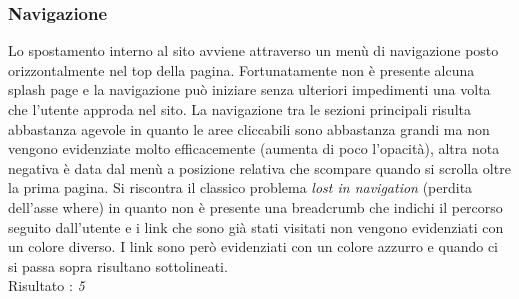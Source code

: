 \subsubsection{Navigazione}
Lo spostamento interno al sito avviene attraverso un menù di navigazione posto
orizzontalmente nel top della pagina. Fortunatamente non è presente alcuna
splash page e la navigazione può iniziare senza ulteriori impedimenti 
una volta che l'utente approda nel sito. 
La navigazione tra le sezioni principali
risulta abbastanza agevole in quanto le aree cliccabili sono abbastanza grandi
ma non vengono evidenziate molto efficacemente (aumenta di poco l'opacità),
altra nota negativa è data dal 
menù a posizione relativa che scompare quando si scrolla oltre la prima pagina.
Si riscontra il classico problema \textit{lost in navigation} (perdita dell'asse
where) in quanto non è
presente una breadcrumb che indichi il percorso seguito dall'utente e i link che 
sono già stati visitati non vengono evidenziati con un colore diverso. I link 
sono però evidenziati con un colore azzurro e quando ci si passa sopra risultano
sottolineati. \\
Risultato : \textit{5}
